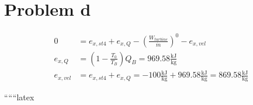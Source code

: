 \section*{Problem d}

\begin{align*}
0 &= e_{x,st4} + e_{x,Q} - \left( \frac{W_{turbine}}{\dot{m}} \right)^0 - e_{x,vel} \\
e_{x,Q} &= \left( 1 - \frac{T_0}{T_B} \right) Q_B = 969.58 \frac{\text{kJ}}{\text{kg}} \\
e_{x,vel} &= e_{x,st4} + e_{x,Q} = -100 \frac{\text{kJ}}{\text{kg}} + 969.58 \frac{\text{kJ}}{\text{kg}} = 869.58 \frac{\text{kJ}}{\text{kg}}
\end{align*}

``````latex